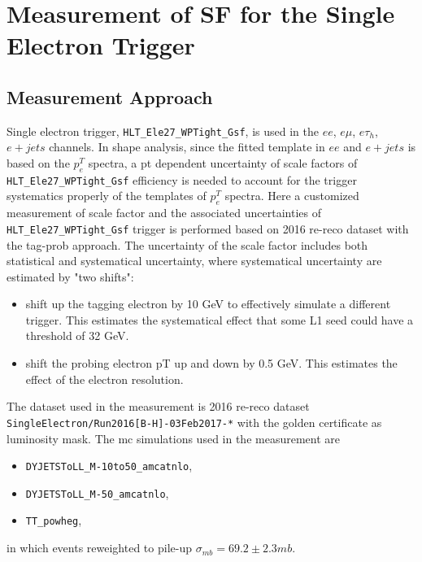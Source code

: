 
\section{Measurement of SF for the Single Electron Trigger}

\subsection{Measurement Approach}

Single electron trigger, \texttt{HLT\_Ele27\_WPTight\_Gsf}, is used in the $ee$, $e\mu$, $e\tau_h$, $e+jets$ channels.
In shape analysis, since the fitted template in $ee$ and $e+jets$ is based on the $p^T_e$ spectra, a pt dependent 
uncertainty of scale factors of \texttt{HLT\_Ele27\_WPTight\_Gsf} efficiency is needed to account for the trigger 
systematics properly of the templates of $p^T_e$ spectra. Here a customized measurement of scale factor and the 
associated uncertainties
of \texttt{HLT\_Ele27\_WPTight\_Gsf} trigger is performed based on 2016 re-reco dataset with the tag-prob approach. 
The uncertainty
of the scale factor includes both statistical and systematical uncertainty, where systematical uncertainty are estimated by
"two shifts":

\begin{itemize}
  \item shift up the tagging electron by 10 GeV to effectively simulate a different trigger. This estimates the 
  systematical effect that some L1 seed could have a threshold of 32 GeV.
  \item shift the probing electron pT up and down by 0.5 GeV. This estimates the effect of the electron \pt resolution.
\end{itemize}

The dataset used in the measurement is 2016 re-reco dataset \texttt{ SingleElectron/Run2016[B-H]-03Feb2017-*}
with the golden certificate as luminosity mask. The mc simulations used in the measurement are 
\begin{itemize}
    \item \texttt{DYJETSToLL\_M-10to50\_amcatnlo},
    \item \texttt{DYJETSToLL\_M-50\_amcatnlo},
    \item \texttt{TT\_powheg},
\end{itemize}
\noindent in which events reweighted to pile-up $\sigma_{mb} = 69.2\pm 2.3 mb$.

